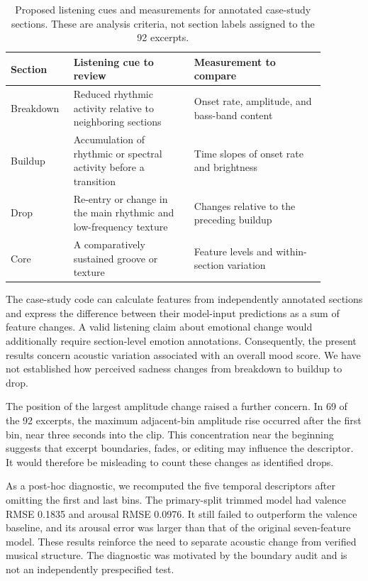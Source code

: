 \begin{table}[ht]
\centering
\caption{Proposed listening cues and measurements for annotated case-study sections. These are analysis criteria, not section labels assigned to the 92 excerpts.}
\label{tab:sections}
\begin{tabular}{p{0.15\linewidth}p{0.35\linewidth}p{0.38\linewidth}}
\toprule
Section & Listening cue to review & Measurement to compare \\
\midrule
Breakdown & Reduced rhythmic activity relative to neighboring sections & Onset rate, amplitude, and bass-band content \\
Buildup & Accumulation of rhythmic or spectral activity before a transition & Time slopes of onset rate and brightness \\
Drop & Re-entry or change in the main rhythmic and low-frequency texture & Changes relative to the preceding buildup \\
Core & A comparatively sustained groove or texture & Feature levels and within-section variation \\
\bottomrule
\end{tabular}
\end{table}

The case-study code can calculate features from independently annotated sections and express the difference between their model-input predictions as a sum of feature changes. A valid listening claim about emotional change would additionally require section-level emotion annotations. Consequently, the present results concern acoustic variation associated with an overall mood score. We have not established how perceived sadness changes from breakdown to buildup to drop.

The position of the largest amplitude change raised a further concern. In 69 of the 92 excerpts, the maximum adjacent-bin amplitude rise occurred after the first bin, near three seconds into the clip. This concentration near the beginning suggests that excerpt boundaries, fades, or editing may influence the descriptor. It would therefore be misleading to count these changes as identified drops.

As a post-hoc diagnostic, we recomputed the five temporal descriptors after omitting the first and last bins. The primary-split trimmed model had valence RMSE 0.1835 and arousal RMSE 0.0976. It still failed to outperform the valence baseline, and its arousal error was larger than that of the original seven-feature model. These results reinforce the need to separate acoustic change from verified musical structure. The diagnostic was motivated by the boundary audit and is not an independently prespecified test.

